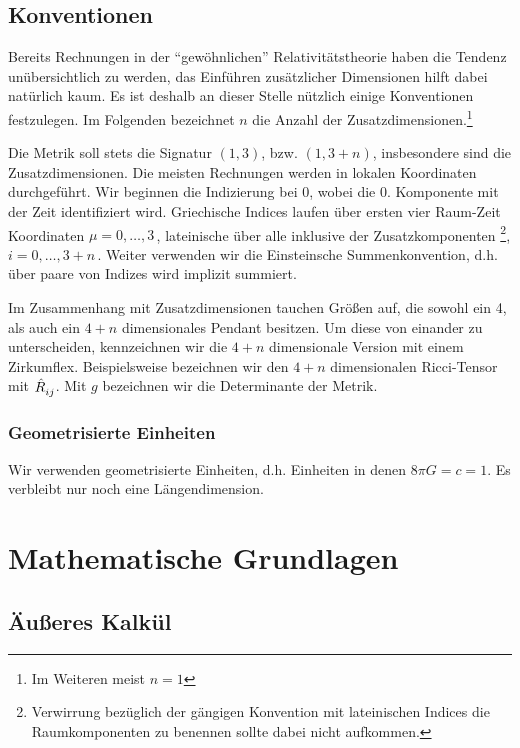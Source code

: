 \section{Konventionen}
Bereits Rechnungen in der "`gewöhnlichen"' Relativitätstheorie haben die Tendenz
unübersichtlich zu werden, das Einführen zusätzlicher Dimensionen hilft dabei
natürlich kaum.
Es ist deshalb an dieser Stelle nützlich einige Konventionen festzulegen. Im
Folgenden bezeichnet $n$ die Anzahl der Zusatzdimensionen.\footnote{Im Weiteren
meist $n=1$}

Die Metrik soll stets die Signatur $(1,3)$, bzw. $(1,3+n)$, insbesondere sind
die Zusatzdimensionen. Die meisten Rechnungen werden in lokalen Koordinaten
durchgeführt.
Wir beginnen die Indizierung bei 0, wobei die 0. Komponente mit der Zeit identifiziert wird.
Griechische Indices laufen über ersten vier Raum-Zeit Koordinaten
$\mu=0,\ldots,3\,$, lateinische über alle inklusive der
Zusatzkomponenten \footnote{Verwirrung bezüglich der gängigen Konvention
mit lateinischen Indices die Raumkomponenten zu benennen sollte dabei nicht
aufkommen.}, $i=0,\ldots,3+n\,$. Weiter verwenden wir die Einsteinsche
Summenkonvention, d.h. über paare von Indizes wird implizit summiert.

Im Zusammenhang mit Zusatzdimensionen tauchen Größen auf, die sowohl ein 4, als
auch ein $4+n$ dimensionales Pendant besitzen. Um diese von einander zu
unterscheiden, kennzeichnen wir die $4+n$ dimensionale Version mit einem
Zirkumflex.
Beispielsweise bezeichnen wir den $4+n$ dimensionalen Ricci-Tensor mit
$\tensor{\hat{R}}{_i_j}$. Mit $g$ bezeichnen wir die Determinante der Metrik.
\subsection*{Geometrisierte Einheiten}
Wir verwenden geometrisierte Einheiten, d.h. Einheiten in denen
$8\pi G=c=1$. Es verbleibt nur noch eine Längendimension.
\chapter{Mathematische Grundlagen}
\section{Äußeres Kalkül}

